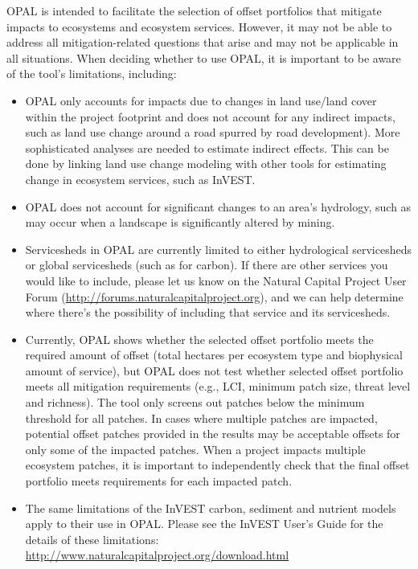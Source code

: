 \documentclass[11pt,letterpaper]{report}
\begin{document}
	OPAL is intended to facilitate the selection of offset portfolios that mitigate impacts to ecosystems and ecosystem services. However, it may not be able to address all mitigation-related questions that arise and may not be applicable in all situations. When deciding whether to use OPAL, it is important to be aware of the tool's limitations, including:
	
	\begin{itemize}
		\item OPAL only accounts for impacts due to changes in land use/land cover within the project footprint and does not account for any indirect impacts, such as  land use change around a road spurred by road development). More sophisticated analyses are needed to estimate indirect effects. This can be done by linking land use change modeling with other tools for estimating change in ecosystem services, such as InVEST.
		
		\item OPAL does not account for significant changes to an area's hydrology, such as may occur when a landscape is significantly altered by mining.
		
		\item Servicesheds in OPAL are currently limited to either hydrological servicesheds or global servicesheds (such as for carbon). If there are other services you would like to include, please let us know on the Natural Capital Project User Forum (\url{http://forums.naturalcapitalproject.org}), and we can help determine where there’s the possibility of including that service and its servicesheds.
	
		\item Currently, OPAL shows whether the selected offset portfolio meets the required amount of offset (total hectares per ecosystem type and biophysical amount of service), but OPAL does not test whether selected offset portfolio meets all mitigation requirements (e.g., LCI, minimum patch size, threat level and richness). The tool only screens out patches below the minimum threshold for all patches. In cases where multiple patches are impacted, potential offset patches provided in the results may be acceptable offsets for only some of the impacted patches. When a project impacts multiple ecosystem patches, it is important to independently check that the final offset portfolio meets requirements for each impacted patch.
		
		\item The same limitations of the InVEST carbon, sediment and nutrient models apply to their use in OPAL. Please see the InVEST User's Guide for the details of these limitations: \url{http://www.naturalcapitalproject.org/download.html}
	\end{itemize}
\end{document}
